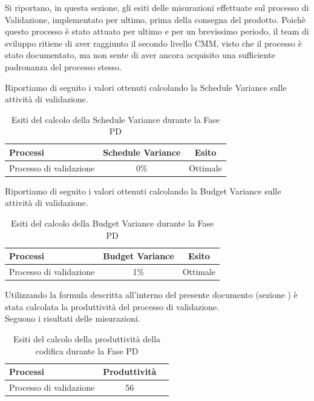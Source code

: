 		Si riportano, in questa sezione, gli esiti delle misurazioni effettuate sul processo di Validazione, implementato per ultimo, prima della consegna del prodotto.
			Poichè questo processo è stato attuato per ultimo e per un brevissimo periodo, il team di sviluppo ritiene di aver raggiunto il secondo livello CMM, visto che il processo è stato documentato, ma non sente di aver ancora acquisito una sufficiente padronanza del processo stesso.
			
			 Riportiamo di seguito i valori ottenuti calcolando la Schedule Variance sulle attività di validazione.
			\begin{table}[H]
				\centering
				\begin{tabu}{| l | c | c |}
					\hline
						Processi 						& Schedule Variance	& Esito		\\ \hline \hline
						Processo di validazione & 0\% & Ottimale \\ \hline
				\end{tabu}
				\caption{Esiti del calcolo della Schedule Variance durante la Fase PD}
			\end{table}	
						
			Riportiamo di seguito i valori ottenuti calcolando la Budget Variance sulle attività di validazione.		\\
			\begin{table}[H]
			\centering
				\begin{tabu}{| l | c | c |}
					\hline
						Processi 						& Budget Variance	& Esito		\\ \hline \hline
						Processo di validazione & 1\% & Ottimale \\ \hline
				\end{tabu}
				\caption{Esiti del calcolo della Budget Variance durante la Fase PD}
			\end{table}	
							
			Utilizzando la formula descritta all'interno del presente documento (sezione ) è stata calcolata la produttività del processo di validazione. \\
			Seguono i risultati delle misurazioni.
			\\ 
			\begin{table}[H]
				\centering
				\begin{tabu}{| l | c | c |}
					\hline
						Processi 						& Produttività		\\ \hline \hline
						Processo di validazione & 56   \\ \hline
				\end{tabu}
				\caption{Esiti del calcolo della produttività della codifica durante la Fase PD}
			\end{table}		
					

